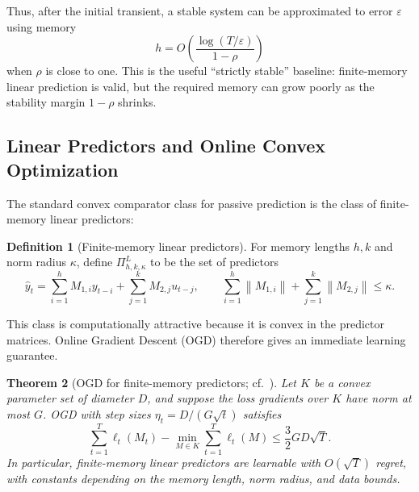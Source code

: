 \documentclass[11pt]{article}
\theoremstyle{plain}
\newtheorem{theorem}{Theorem}[section]
\theoremstyle{definition}
\newtheorem{definition}[theorem]{Definition}
\theoremstyle{remark}
\newcommand{\norm}[1]{\left\lVert#1\right\rVert}
\begin{document}
Thus, after the initial transient, a stable system can be approximated to error $\varepsilon$ using memory
\[
    h = O\!\left(\frac{\log(T/\varepsilon)}{1-\rho}\right)
\]
when $\rho$ is close to one. This is the useful ``strictly stable'' baseline: finite-memory linear prediction is valid, but the required memory can grow poorly as the stability margin $1-\rho$ shrinks.

\subsection{Linear Predictors and Online Convex Optimization}
\label{sec:linear-predictors}

The standard convex comparator class for passive prediction is the class of finite-memory linear predictors:
\begin{definition}[Finite-memory linear predictors]
\label{def:linear-predictors}
For memory lengths $h,k$ and norm radius $\kappa$, define $\Pi^L_{h,k,\kappa}$ to be the set of predictors
\begin{equation}
    \hat y_t
    =
    \sum_{i=1}^{h} M_{1,i} y_{t-i}
    +
    \sum_{j=1}^{k} M_{2,j} u_{t-j},
    \qquad
    \sum_{i=1}^{h}\norm{M_{1,i}}
    +
    \sum_{j=1}^{k}\norm{M_{2,j}}
    \le \kappa.
    \label{eq:linear-predictor}
\end{equation}
\end{definition}

This class is computationally attractive because it is convex in the predictor matrices. Online Gradient Descent (OGD) therefore gives an immediate learning guarantee.

\begin{theorem}[OGD for finite-memory predictors; cf.\ {\citet[Thm.~6.1 and Cor.~9.7]{hazan2025onlinecontrol}}]
\label{thm:ogd-linear-predictors}
Let $K$ be a convex parameter set of diameter $D$, and suppose the loss gradients over $K$ have norm at most $G$. OGD with step sizes $\eta_t=D/(G\sqrt t)$ satisfies
\begin{equation}
    \sum_{t=1}^{T} \ell_t(M_t)
    -
    \min_{M \in K}\sum_{t=1}^{T}\ell_t(M)
    \le
    \frac{3}{2}GD\sqrt T .
    \label{eq:ogd-regret}
\end{equation}
In particular, finite-memory linear predictors are learnable with $O(\sqrt T)$ regret, with constants depending on the memory length, norm radius, and data bounds.
\end{theorem}
\end{document}
